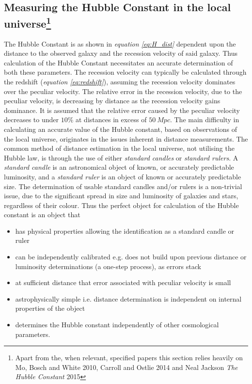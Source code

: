 \documentclass[a4paper, 12pt, twoside]{article}
\begin{document}
\subsection[Measuring the Hubble Constant in the local universe]{Measuring the Hubble Constant in the local universe\footnote{Apart from the, when relevant, specified papers this section relies heavily on Mo, Bosch and White 2010, Carroll and Ostlie 2014 and Neal Jackson \emph{The Hubble Constant} 2015}}
The Hubble Constant is as shown in \emph{equation \ref{eq:H_dist}} dependent upon the distance to the observed galaxy and the recession velocity of said galaxy. Thus calculation of the Hubble Constant necessitates an accurate determination of both these parameters. The recession velocity can typically be calculated through the redshift (\emph{equation \ref{eq:redshift}}), assuming the recession velocity dominates over the peculiar velocity. The relative error in the recession velocity, due to the peculiar velocity, is decreasing by distance as the recession velocity gains dominance. It is assumed that the relative error caused by the peculiar velocity decreases to under $10\%$ at distances in excess of $50\ Mpc$. The main difficulty in calculating an accurate value of the Hubble constant, based on observations of the local universe, originates in the issues inherent in distance measurements. The common method of distance estimation in the local universe, not utilising the Hubble law, is through the use of either \emph{standard candles} or \emph{standard rulers}. A \emph{standard candle} is an astronomical object of known, or accurately predictable luminosity, and a \emph{standard ruler} is an object of known or accurately predictable size. The determination of usable standard candles and/or rulers is a non-trivial issue, due to the significant spread in size and luminosity of galaxies and stars, regardless of their colour. Thus the perfect object for calculation of the Hubble constant is an object that
\begin{itemize}
\item has physical properties allowing the identification as a standard candle or ruler
\item can be independently calibrated e.g. does not build upon previous distance or luminosity determinations (a one-step process), as errors stack
\item at sufficient distance that error associated with peculiar velocity is small
\item astrophysically simple i.e. distance determination is independent on internal properties of the object
\item determines the Hubble constant independently of other cosmological parameters.
\end{itemize}
\end{document}
